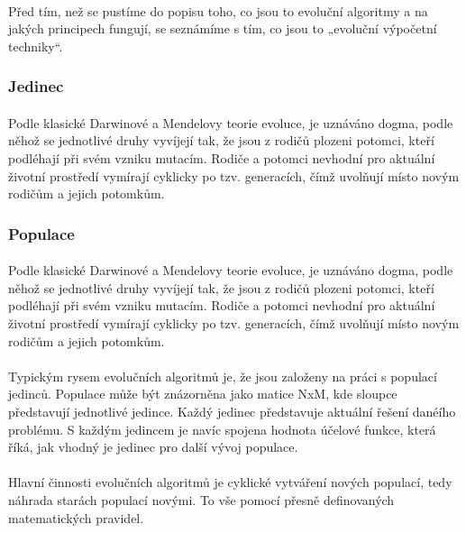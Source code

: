 \documentclass[bc,male,java,dept460]{diploma}		%
\begin{document}
\paragraph*{}
Před tím, než se pustíme do popisu toho, co jsou to evoluční algoritmy a na jakých principech fungují, se seznámíme s tím, co jsou to „evoluční výpočetní techniky“.

\subsubsection{Jedinec}
\paragraph*{}
Podle klasické Darwinové a Mendelovy teorie evoluce, je uznáváno dogma, podle něhož se jednotlivé druhy vyvíjejí tak, že jsou z rodičů plozeni potomci, kteří podléhají při svém vzniku mutacím. Rodiče a potomci nevhodní pro aktuální životní prostředí vymírají cyklicky po tzv. generacích, čímž uvolňují místo novým rodičům a jejich potomkům.

\subsubsection{Populace}
\paragraph*{}
Podle klasické Darwinové a Mendelovy teorie evoluce, je uznáváno dogma, podle něhož se jednotlivé druhy vyvíjejí tak, že jsou z rodičů plozeni potomci, kteří podléhají při svém vzniku mutacím. Rodiče a potomci nevhodní pro aktuální životní prostředí vymírají cyklicky po tzv. generacích, čímž uvolňují místo novým rodičům a jejich potomkům.

\paragraph*{}
Typickým rysem evolučních algoritmů je, že jsou založeny na práci s populací jedinců. Populace může být znázorněna jako matice NxM, kde sloupce představují jednotlivé jedince. Každý jedinec představuje aktuální řešení danéího problému. S každým jedincem je navíc spojena hodnota účelové funkce, která říká, jak vhodný je jedinec pro další vývoj populace.

\paragraph*{}
Hlavní činnosti evolučních algoritmů je cyklické vytváření nových populací, tedy náhrada starách populací novými. To vše pomocí přesně definovaných matematických pravidel.
\end{document}
